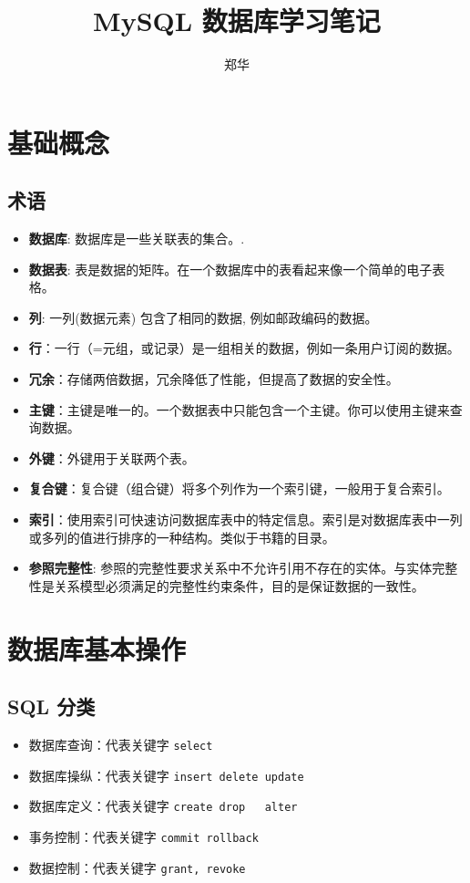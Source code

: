\documentclass[UTF8,a4paper,12pt]{ctexbook}
\author{\kaishu 郑华}
\title{\heiti MySQL 数据库学习笔记}
\begin{document}
 	\maketitle
 \chapter{基础概念}
	 \section{术语}
		 \begin{itemize}
		 	\item  \textbf{数据库}: 数据库是一些关联表的集合。.
		 	\item  \textbf{数据表}: 表是数据的矩阵。在一个数据库中的表看起来像一个简单的电子表格。
		 	\item  \textbf{列}: 一列(数据元素) 包含了相同的数据, 例如邮政编码的数据。
		 	\item  \textbf{行}：一行（=元组，或记录）是一组相关的数据，例如一条用户订阅的数据。
		 	\item  \textbf{冗余}：存储两倍数据，冗余降低了性能，但提高了数据的安全性。
		 	\item  \textbf{主键}：主键是唯一的。一个数据表中只能包含一个主键。你可以使用主键来查询数据。
		 	\item  \textbf{外键}：外键用于关联两个表。
		 	\item  \textbf{复合键}：复合键（组合键）将多个列作为一个索引键，一般用于复合索引。
		 	\item  \textbf{索引}：使用索引可快速访问数据库表中的特定信息。索引是对数据库表中一列或多列的值进行排序的一种结构。类似于书籍的目录。
		 	\item  \textbf{参照完整性}: 参照的完整性要求关系中不允许引用不存在的实体。与实体完整性是关系模型必须满足的完整性约束条件，目的是保证数据的一致性。
		 \end{itemize}
		
	 
 \chapter{数据库基本操作}
 
	 \section{SQL 分类}
		\begin{itemize}
			\item 数据库查询：代表关键字 \verb|select|
			\item 数据库操纵：代表关键字 \verb|insert delete update|
			\item 数据库定义：代表关键字 \verb|create drop   alter|
			\item 事务控制：代表关键字 \verb|commit rollback|
			\item 数据控制：代表关键字 \verb|grant, revoke|
		\end{itemize} 
	
\end{document}
